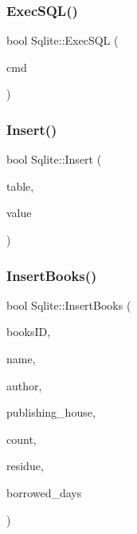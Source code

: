 \mbox{\label{class_sqlite_a3d4be952cdb19b674a80dacd78e2873a}} 
\subsubsection{\texorpdfstring{ExecSQL()}{ExecSQL()}}
{\footnotesize\ttfamily bool Sqlite\+::\+Exec\+S\+QL (\begin{DoxyParamCaption}\item[{Q\+String}]{cmd }\end{DoxyParamCaption})}

\mbox{\label{class_sqlite_a8d0c32df6db2b0ca13695cfa8780840e}} 
\subsubsection{\texorpdfstring{Insert()}{Insert()}}
{\footnotesize\ttfamily bool Sqlite\+::\+Insert (\begin{DoxyParamCaption}\item[{Q\+String}]{table,  }\item[{Q\+String}]{value }\end{DoxyParamCaption})}

\mbox{\label{class_sqlite_a51b44b9e10f90888b36088adb6ec6226}} 
\subsubsection{\texorpdfstring{InsertBooks()}{InsertBooks()}}
{\footnotesize\ttfamily bool Sqlite\+::\+Insert\+Books (\begin{DoxyParamCaption}\item[{Q\+String}]{books\+ID,  }\item[{Q\+String}]{name,  }\item[{Q\+String}]{author,  }\item[{Q\+String}]{publishing\+\_\+house,  }\item[{int}]{count,  }\item[{int}]{residue,  }\item[{int}]{borrowed\+\_\+days }\end{DoxyParamCaption})}

